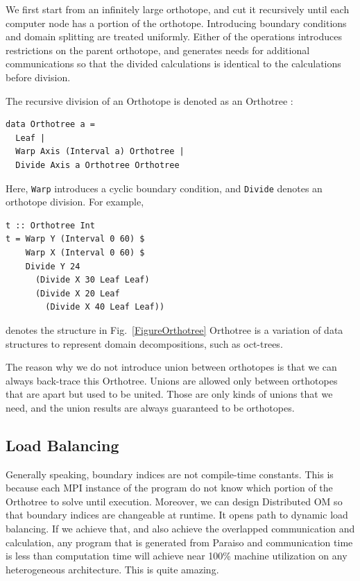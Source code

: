 \documentclass[twocolumn]{article}
\begin{document}
We first start from an infinitely large orthotope, and cut it recursively
until each computer node has a portion of the orthotope. Introducing boundary
conditions and domain splitting are treated uniformly. Either of the
operations introduces restrictions on the parent orthotope, and generates
needs for additional communications so that the divided calculations is
identical to the calculations before division.

The recursive division of an Orthotope is denoted as an Orthotree :
\begin{verbatim}
data Orthotree a = 
  Leaf |
  Warp Axis (Interval a) Orthotree |
  Divide Axis a Orthotree Orthotree
\end{verbatim}

Here, {\tt Warp} introduces a cyclic boundary condition, and {\tt Divide}
denotes an orthotope division. For example,

\begin{verbatim}
t :: Orthotree Int
t = Warp Y (Interval 0 60) $
    Warp X (Interval 0 60) $
    Divide Y 24 
      (Divide X 30 Leaf Leaf)
      (Divide X 20 Leaf
        (Divide X 40 Leaf Leaf))
\end{verbatim}

denotes the structure in Fig.~\ref{FigureOrthotree} Orthotree is a variation
of data structures to represent domain decompositions, such as oct-trees.

The reason why we do not introduce union between orthotopes is that we can
always back-trace this Orthotree. Unions are allowed only between orthotopes
that are apart but used to be united. Those are only kinds of unions that we
need, and the union results are always guaranteed to be orthotopes.

\subsection{Load Balancing}

Generally speaking, boundary indices are not compile-time constants. This is
because each MPI instance of the program do not know which portion of the
Orthotree to solve until execution. Moreover, we can design Distributed OM so
that boundary indices are changeable at runtime. It opens path to dynamic load
balancing. If we achieve that, and also achieve the overlapped communication
and calculation, any program that is generated from Paraiso and communication
time is less than computation time will achieve near 100\% machine utilization
on any heterogeneous architecture. This is quite amazing.
\end{document}
